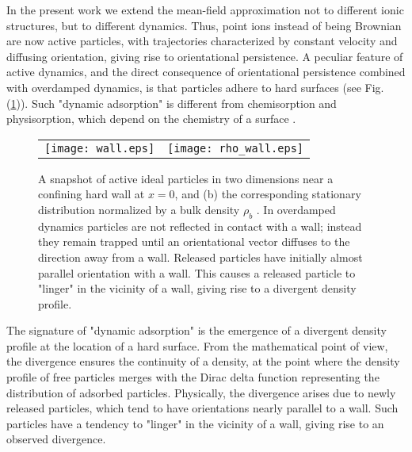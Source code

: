 \documentclass[pre,twocolumn,graphicx]{revtex4-1}
\begin{document}
In the present work we extend the mean-field approximation not to different ionic structures, but to different 
dynamics. Thus, point ions instead of being Brownian are now active particles, with trajectories characterized 
by constant velocity and diffusing orientation, giving rise to orientational persistence. 
A peculiar feature of active dynamics, and the direct consequence of orientational persistence combined with 
overdamped dynamics, is that particles adhere to hard surfaces \cite{Lee13} (see Fig. (\ref{fig:pic})).  
Such "dynamic adsorption" is different from chemisorption and physisorption, which depend on the chemistry of 
a surface  
\cite{Ninham71,White75,Rudi14,Rudi15,Tomer16,Tomer18,Blum89,McQuarrie95,McQuarrie96a,McQuarrie96b}.  
\graphicspath{{figures/}}
\begin{figure}[h] 
 \begin{center}
 \begin{tabular}{rr}
\hspace{-1cm}  \texttt{[image: wall.eps]}&
  \hspace{0.5cm}\texttt{[image: rho\_wall.eps]}\\
 \end{tabular}
 \end{center}
\caption{A snapshot of active ideal particles in two dimensions near a confining hard wall at $x=0$, 
and (b) the corresponding stationary distribution normalized by a bulk density $\rho_b$ . In overdamped dynamics 
particles are not reflected in contact with a wall; instead they remain trapped until an orientational vector 
diffuses to the direction away from a wall. Released particles have initially almost parallel orientation with 
a wall. This causes a released particle to "linger" in the vicinity of a wall, giving rise to a divergent density profile.}
\label{fig:pic}
\end{figure}


The signature of "dynamic adsorption" is the emergence of a divergent density profile at the location of a 
hard surface. From the mathematical point of view, the divergence ensures the continuity of a density, at 
the point where the density profile of free particles merges with the Dirac delta function representing the 
distribution of adsorbed particles. Physically, the divergence arises due to newly released particles, 
which tend to have orientations nearly parallel to a wall.  Such particles have a tendency to "linger" 
in the vicinity of a wall, giving rise to an observed divergence.
\end{document}
